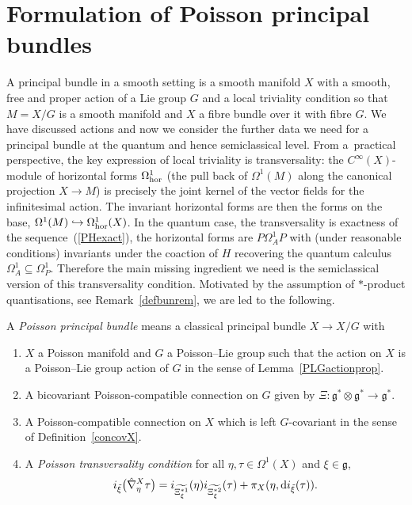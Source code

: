 \documentclass[pdftex]{sigma}
\numberwithin{equation}{section}
\newcommand{\<}{{\langle}}
\renewcommand{\>}{{\rangle}}
\newcommand{\tens}{\otimes}
\newcommand{\extd}{{\rm d}}
\newcommand{\cg}{{\mathfrak{g}}}
\begin{document}
\section{Formulation of Poisson principal bundles}\label{PPB}

A principal bundle in a smooth setting is a smooth manifold $X$ with a smooth, free and proper action of a Lie group $G$ and a local triviality condition so that $M=X/G$ is a smooth manifold and $X$ a fibre bundle over it with fibre $G$. We have discussed actions and now we consider the further data we need for a principal bundle at the quantum and hence semiclassical level. From a~practical perspective, the key expression of local triviality is transversality: the $C^\infty(X)$-module of horizontal forms $\Omega^1_{\rm hor}$ (the pull back of $\Omega^1(M)$ along the canonical projection $X\to M$) is precisely the joint kernel of the vector fields for the infinitesimal action. The invariant horizontal forms are then the forms on the base, $\Omega^1(M)\hookrightarrow\Omega^1_{\rm hor}(X)$. In the quantum case, the transversality is exactness of the sequence~(\ref{PHexact}), the horizontal forms are $P\Omega^1_AP$ with (under reasonable conditions) invariants under the coaction of $H$ recovering the quantum calculus $\Omega^1_A\subseteq \Omega^1_P$. Therefore the main missing ingredient we need is the semiclassical version of this transversality condition. Motivated by the assumption of $*$-product quantisations, see Remark~\ref{defbunrem}, we are led to the following.
\begin{Definition}\label{PPBdef}
A {\em Poisson principal bundle} means a classical principal bundle $X\to X/G$ with
\begin{enumerate}\itemsep=0pt
\item $X$ a Poisson manifold and $G$ a Poisson--Lie group such that the action on $X$ is a Poisson--Lie group action of $G$ in the sense of Lemma~\ref{PLGactionprop}.
\item A bicovariant Poisson-compatible connection on $G$ given by $\Xi\colon \cg^*\tens\cg^*\to\cg^*$.
\item A Poisson-compatible connection on $X$ which is left $G$-covariant in the sense of Definition~\ref{concovX}.
\item A {\em Poisson transversality condition} for all $\eta,\tau\in \Omega^1(X)$ and $\xi\in\cg$,
\begin{equation*}
i_{\tilde\xi}\big(\hat\nabla^X_{\eta}\tau\big)=i_{\widetilde{\Xi^{*1}_\xi}}(\eta)i_{\widetilde{\Xi^{*2}_\xi}}(\tau)+\pi_X(\eta,\extd i_{\tilde\xi}(\tau)).
\end{equation*}
\end{enumerate}
\end{Definition}
\end{document}
